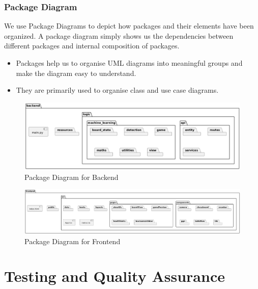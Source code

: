 \newpage

\subsubsection*{Package Diagram}

We use Package Diagrams to depict how packages and their elements have been organized. A package diagram simply shows us the dependencies between different packages and internal composition of packages.

\begin{itemize}
    \item Packages help us to organise UML diagrams into meaningful groups and make the diagram easy to understand.
    \item They are primarily used to organise class and use case diagrams.
\end{itemize}

\begin{figure}[h!]
    \centering
    \includegraphics[width=\linewidth]{figures/results//uml/package-backend.png}
    \caption{Package Diagram for Backend}
    \label{fig:package-backend}
\end{figure}

\begin{figure}[h!]
    \centering
    \includegraphics[width=\linewidth]{figures/results//uml/package-frontend.png}
    \caption{Package Diagram for Frontend}
    \label{fig:package-frontend}
\end{figure}

\newpage

\section{Testing and Quality Assurance}

